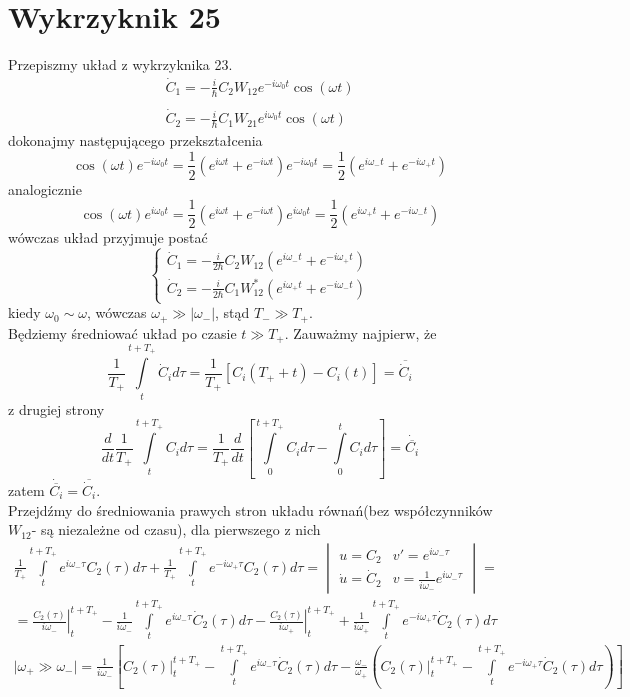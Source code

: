 \documentclass[a4paper,12pt]{article}
\begin{document}
\section{Wykrzyknik 25}
	Przepiszmy układ z wykrzyknika 23.
	$$
	\begin{array}{l}
		\dot{C}_1 = -\frac{i}{\hbar}C_2 W_{12}e^{-i\omega_0 t}\cos(\omega t)\\\\
		\dot{C}_2 =  -\frac{i}{\hbar}C_1 W_{21}e^{i\omega_0t}\cos(\omega t)
	\end{array}
	$$
	dokonajmy następującego przekształcenia
	$$
	\cos(\omega t) e^{-i\omega_0t} = \frac{1}{2}\left( e^{i\omega t}+e^{-i\omega t} \right)e^{-i\omega_0t} = \frac{1}{2}\left(e^{i\omega_{-}t}+e^{-i\omega_{+}t}\right)
	$$
	analogicznie
	$$
	\cos(\omega t) e^{i\omega_0t} = \frac{1}{2}\left( e^{i\omega t}+e^{-i\omega t} \right)e^{i\omega_0t} = \frac{1}{2}\left(e^{i\omega_{+}t}+e^{-i\omega_{-}t}\right)
	$$
	wówczas układ przyjmuje postać
	$$
	\left\{\begin{gathered}
		\dot{C}_1 = -\frac{i}{2\hbar}C_2 W_{12} \left(e^{i\omega_{-}t}+e^{-i\omega_{+}t}\right)\\
		\dot{C}_2 =  -\frac{i}{2\hbar}C_1 W_{12}^* \left(e^{i\omega_{+}t}+e^{-i\omega_{-}t}\right)
	\end{gathered} \right.
	$$
	kiedy $\omega_0 \sim \omega$, wówczas $\omega_{+}\gg|\omega_{-}|$, stąd $T_- \gg T_+$.\\
	Będziemy średniować układ po czasie $t\gg T_+$. Zauważmy najpierw, że
	$$
	\frac{1}{T_+}\int\limits_t^{t+T_+}\dot{C}_id\tau = \frac{1}{T_+}\left[C_i(T_++t)-C_i(t)\right] = \overline{\dot{C}_i}
	$$
	z drugiej strony
	$$
	\frac{d}{dt}\frac{1}{T_+}\int\limits_t^{t+T_+}C_id\tau = \frac{1}{T_+}\frac{d}{dt}\left[\int\limits_0^{t+T_+}C_id\tau-\int\limits_0^t C_id\tau\right] = \dot{\overline{C_i}}
	$$
	zatem $\dot{\overline{C_i}} = \overline{\dot{C}_i}$.\\
	Przejdźmy do średniowania prawych stron układu równań(bez współczynników $W_{12}$- są niezależne od czasu), dla pierwszego z nich
	$$
	\begin{gathered}
		\frac{1}{T_+}\int\limits_t^{t+T_+}e^{i\omega_{-}\tau}C_2(\tau)d\tau + \frac{1}{T_+}\int\limits_t^{t+T_+}e^{-i\omega_{+}\tau}C_2(\tau)d\tau =
		\begin{vmatrix}
			u = C_2 & v'=e^{i\omega_{-}\tau}\\ \dot{u}=\dot{C}_2 & v = \frac{1}{i\omega_-}e^{i\omega_-\tau}
		\end{vmatrix} = \\
		= \left.\frac{C_2(\tau)}{i\omega_-}\right|_t^{t+T_+} - \frac{1}{i\omega_-}\int\limits_t^{t+T_+}e^{i\omega_-\tau}\dot{C}_2(\tau)d\tau - \left.\frac{C_2(\tau)}{i\omega_+}\right|_t^{t+T_+} + \frac{1}{i\omega_+}\int\limits_t^{t+T_+}e^{-i\omega_+\tau}\dot{C}_2(\tau)d\tau \\
		\bigg\vert \omega_+ \gg \omega_- \bigg\vert = \frac{1}{i\omega_-}\left[\left.C_2(\tau)\right|_t^{t+T_+} -\int\limits_t^{t+T_+}e^{i\omega_-\tau}\dot{C}_2(\tau)d\tau
		-\frac{\omega_-}{\omega_+}\left(\left.C_2(\tau)\right|_t^{t+T_+}-\int\limits_t^{t+T_+}e^{-i\omega_+\tau}\dot{C}_2(\tau)d\tau\right)\right]
	\end{gathered}
	$$
\end{document}
